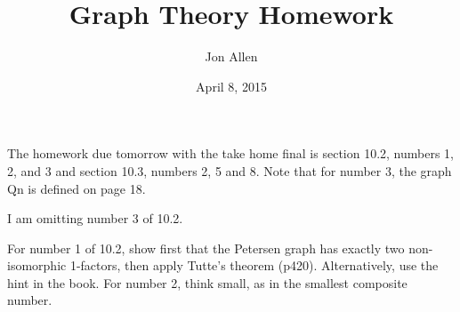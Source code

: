 \documentclass[letterpaper]{article}
\begin{document}
\title{Graph Theory Homework}
\date{April 8, 2015}
\author{Jon Allen}
\maketitle
\renewcommand{\labelenumi}{10.\arabic{enumi}}
\renewcommand{\labelenumii}{\arabic{enumii}.}
\renewcommand{\labelenumiii}{(\alph{enumiii})}
\renewcommand\thefigure{10.\arabic{figure}}
The homework due tomorrow with the take home final is section 10.2, numbers 1, 2, and 3 and section 10.3, numbers 2, 5 and 8.  Note that for number 3, the graph Qn is defined on page 18. 

I am omitting number 3 of 10.2.

For number 1 of 10.2, show first that the Petersen graph has exactly two non-isomorphic 1-factors, then apply Tutte's theorem (p420).  Alternatively, use the hint in the book.  For number 2, think small, as in the smallest composite number.
\end{document}

